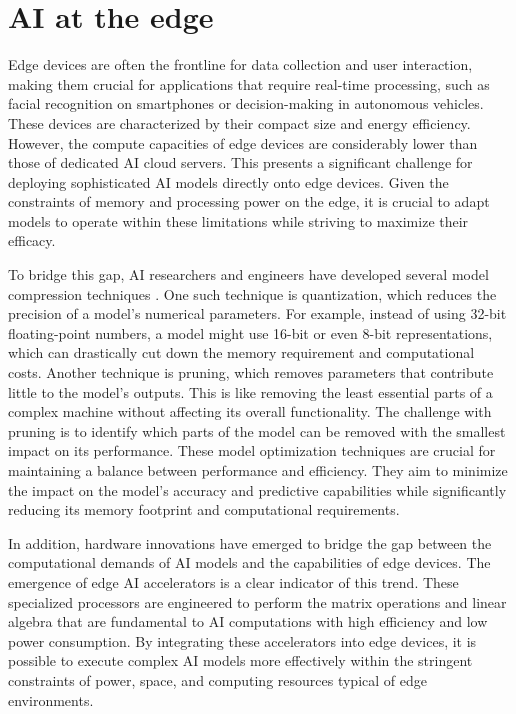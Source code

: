 \section{AI at the edge}

Edge devices are often the frontline for data collection and user interaction, making them crucial for applications that require real-time processing, such as facial recognition on smartphones or decision-making in autonomous vehicles.
These devices are characterized by their compact size and energy efficiency.
However, the compute capacities of edge devices are considerably lower than those of dedicated AI cloud servers.
This presents a significant challenge for deploying sophisticated AI models directly onto edge devices.
Given the constraints of memory and processing power on the edge, it is crucial to adapt models to operate within these limitations while striving to maximize their efficacy.

To bridge this gap, AI researchers and engineers have developed several model compression techniques \cite{neill_overview_2020}.
One such technique is quantization, which reduces the precision of a model's numerical parameters.
For example, instead of using 32-bit floating-point numbers, a model might use 16-bit or even 8-bit representations, which can drastically cut down the memory requirement and computational costs.
Another technique is pruning, which removes parameters that contribute little to the model's outputs.
This is like removing the least essential parts of a complex machine without affecting its overall functionality.
The challenge with pruning is to identify which parts of the model can be removed with the smallest impact on its performance.
These model optimization techniques are crucial for maintaining a balance between performance and efficiency.
They aim to minimize the impact on the model's accuracy and predictive capabilities while significantly reducing its memory footprint and computational requirements.

In addition, hardware innovations have emerged to bridge the gap between the computational demands of AI models and the capabilities of edge devices.
The emergence of edge AI accelerators is a clear indicator of this trend.
These specialized processors are engineered to perform the matrix operations and linear algebra that are fundamental to AI computations with high efficiency and low power consumption.
By integrating these accelerators into edge devices, it is possible to execute complex AI models more effectively within the stringent constraints of power, space, and computing resources typical of edge environments.

